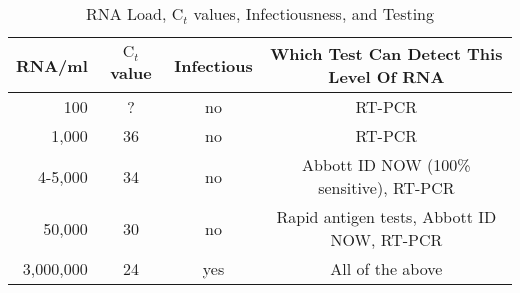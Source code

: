 \documentclass[11pt, oneside]{article}   	%
\begin{document}
\begin{table}
  \begin{center}
    \begin{tabular}{r|c|c|c} 
      \textbf{RNA/ml} & \textbf{$\text{C}_t$ value} & \textbf{Infectious} & \textbf{Which Test Can Detect This Level Of RNA} \\
      \hline 
      \hline 
      100           & ?  & no  & RT-PCR                                                            \\
      1,000        & 36 & no  & RT-PCR                                                           \\
      4-5,000     & 34 & no  & Abbott ID NOW (100\% sensitive), RT-PCR     \\
      50,000      & 30 & no  & Rapid antigen tests, Abbott ID NOW, RT-PCR  \\
      3,000,000 & 24 & yes & All of the above
    \end{tabular}
  \end{center}
 \caption{RNA Load, $\text{C}_t$ values, Infectiousness, and Testing}
\end{table}
\end{document}
